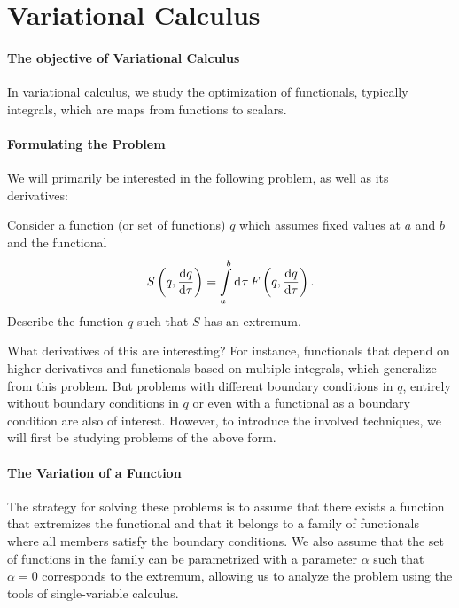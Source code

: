 \section{Variational Calculus}

\paragraph{The objective of Variational Calculus}
In variational calculus, we study the optimization of functionals, typically integrals, which are maps from functions to scalars.

\paragraph{Formulating the Problem}
We will primarily be interested in the following problem, as well as its derivatives:

Consider a function (or set of functions) $q$ which assumes fixed values at $a$ and $b$ and the functional
\begin{align*}
	S\left(q, \dv{q}{\tau}\right) = \int\limits_{a}^{b}\dd[]{\tau}F\left(q, \dv{q}{\tau}\right).
\end{align*}
Describe the function $q$ such that $S$ has an extremum.

What derivatives of this are interesting? For instance, functionals that depend on higher derivatives and functionals based on multiple integrals, which generalize from this problem. But problems with different boundary conditions in $q$, entirely without boundary conditions in $q$ or even with a functional as a boundary condition are also of interest. However, to introduce the involved techniques, we will first be studying problems of the above form.

\paragraph{The Variation of a Function}
The strategy for solving these problems is to assume that there exists a function that extremizes the functional and that it belongs to a family of functionals where all members satisfy the boundary conditions. We also assume that the set of functions in the family can be parametrized with a parameter $\alpha$ such that $\alpha = 0$ corresponds to the extremum\footnotemark, allowing us to analyze the problem using the tools of single-variable calculus.


